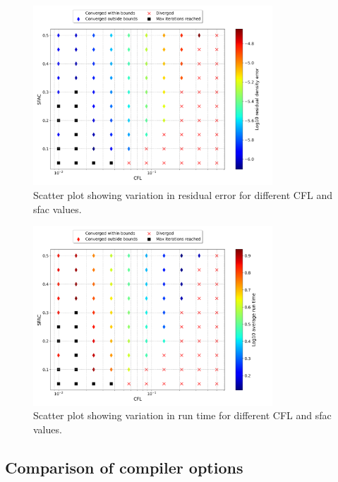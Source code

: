 \documentclass{article}
\begin{document}
\begin{figure}[H]
    \centering
    \includegraphics[width=0.8\textwidth]{figures/bend_cfl_sfac_residual.png}
    \caption{Scatter plot showing variation in residual error for different CFL and sfac values.}
    \label{fig:bend_cfl_sfac_residual}
\end{figure}

\begin{figure}[H]
    \centering
    \centering
    \includegraphics[width=0.8\textwidth]{figures/bend_cfl_sfac_time.png}
    \caption{Scatter plot showing variation in run time for different CFL and sfac values.}
    \label{fig:bend_cfl_sfac_time}
\end{figure}

\subsection{Comparison of compiler options }
\end{document}
